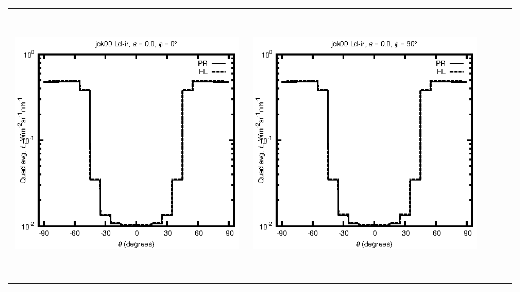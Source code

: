 \documentclass[10pt,a4paper]{article}
\begin{document}
\begin{adjustwidth}{-1.2in}{-1.2in}
\begin{tabular}{c c c c}
\includegraphics[height=7cm]{../eps/jok00_Ld_ir_fwd.eps} &
\includegraphics[height=7cm]{../eps/jok00_Ld_ir_cross.eps} \\
\end{tabular}

\pagebreak


\end{adjustwidth}
\end{document}
